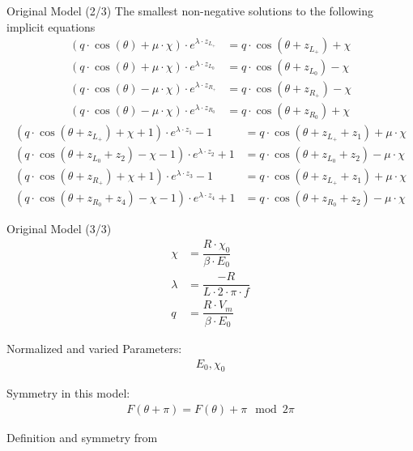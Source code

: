 \begin{frame}{Original Model (2/3)}
	\vspace{-1em}
	The smallest non-negative solutions to the following implicit equations
	\begin{subequations}
		\begin{align}
			(q \cdot \cos(\theta) + \mu \cdot \chi) \cdot e^{\lambda \cdot z_{L_+}}
			 & = q \cdot \cos(\theta + z_{L_+}) + \chi \\
			(q \cdot \cos(\theta) + \mu \cdot \chi) \cdot e^{\lambda \cdot z_{L_0}}
			 & = q \cdot \cos(\theta + z_{L_0}) - \chi \\
			(q \cdot \cos(\theta) - \mu \cdot \chi) \cdot e^{\lambda \cdot z_{R_+}}
			 & = q \cdot \cos(\theta + z_{R_+}) - \chi \\
			(q \cdot \cos(\theta) - \mu \cdot \chi) \cdot e^{\lambda \cdot z_{R_0}}
			 & = q \cdot \cos(\theta + z_{R_0}) + \chi
		\end{align}
	\end{subequations}
	\vspace{-2em}
	\begin{subequations}
		\begin{align}
			(q \cdot \cos(\theta + z_{L_+}) + \chi + 1) \cdot e^{\lambda \cdot z_1} - 1
			 & = q \cdot  \cos(\theta + z_{L_+} + z_1) + \mu \cdot \chi \\
			(q \cdot \cos(\theta + z_{L_0} + z_2) - \chi - 1) \cdot e^{\lambda \cdot z_2} + 1
			 & = q \cdot  \cos(\theta + z_{L_0} + z_2) - \mu \cdot \chi \\
			(q \cdot \cos(\theta + z_{R_+}) + \chi + 1) \cdot e^{\lambda \cdot z_3} - 1
			 & = q \cdot  \cos(\theta + z_{L_+} + z_1) + \mu \cdot \chi \\
			(q \cdot \cos(\theta + z_{R_0} + z_4) - \chi - 1) \cdot e^{\lambda \cdot z_4} + 1
			 & = q \cdot  \cos(\theta + z_{R_0} + z_2) - \mu \cdot \chi
		\end{align}
	\end{subequations}
\end{frame}

\begin{frame}{Original Model (3/3)}
	\vspace{-3.0em}
	\begin{align}
		\chi    & = \dfrac{R \cdot \chi_0}{\beta \cdot E_0} \\
		\lambda & = \dfrac{-R}{L \cdot 2 \cdot \pi \cdot f} \\
		q       & = \dfrac{R \cdot V_m}{\beta \cdot E_0}
	\end{align}

	Normalized and varied Parameters:
	\begin{align*}
		E_0, \chi_0
	\end{align*}

	Symmetry in this model:
	\begin{align}
		F(\theta + \pi) = F(\theta) + \pi \mod 2 \pi
	\end{align}

	\begin{flushright}
		Definition and symmetry from \cite{akyuz2022}
	\end{flushright}
\end{frame}

